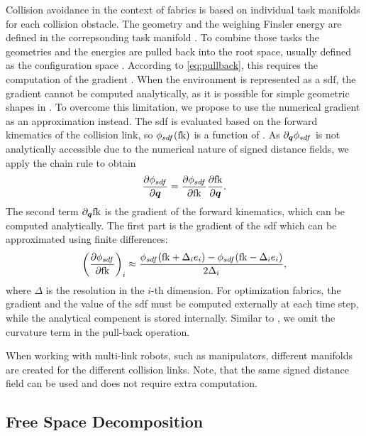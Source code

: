 Collision avoidance in the context of \ac{fabrics} is based on
individual task manifolds for each collision obstacle. The geometry and the 
weighing Finsler energy are defined in the correpsonding task manifold \X{}.
To combine those tasks the geometries and the energies are pulled back into the
root space, usually defined as the configuration space \Q{}. According 
to \cref{eq:pullback}, this requires the computation of the gradient \J{}.
When the environment is represented as a \ac{sdf}, the gradient cannot be
computed analytically, as it is possible for simple geometric shapes in
\cite{Ratliff2021,Spahn2022}. To overcome this limitation, we propose to
use the numerical gradient as an approximation instead.
The \ac{sdf} is evaluated based on the forward kinematics of the collision link,
so $\phi_{sdf}(\textrm{fk})$ is a function of \q{}.
As $\partial_{\bm{q}}\phi_{sdf}$ is not analytically accessible due to the numerical
nature of signed distance fields, we apply the chain rule to obtain
\[
  \frac{\partial\phi_{sdf}}{\partial\bm{q}} = \frac{\partial\phi_{sdf}}{\partial\textrm{fk}}\frac{\partial\textrm{fk}}{\partial\bm{q}}.
\]
The second term $\partial_{\bm{q}}\textrm{fk}$ is the gradient of the forward
kinematics, which can be computed analytically. The first part is the gradient
of the \ac{sdf} which can be
approximated using finite differences:
\[
  \left(\frac{\partial\phi_{sdf}}{\partial\textrm{fk}}\right)_i \approx 
  \frac{\phi_{sdf}(\textrm{fk} + \Delta_i e_i) - \phi_{sdf}(\textrm{fk} - \Delta_i e_i)}{2 \Delta_i},
\]
where $\Delta$ is the resolution in the $i$-th dimension. For optimization
\ac{fabrics}, the gradient and the value of the \ac{sdf} must be computed externally
at each time step, while the analytical compenent is stored internally. Similar
to \cite{Ratliff2021}, we omit the curvature term \Jdot{} in the pull-back
operation.

When working with multi-link robots, such as manipulators, different manifolds
are created for the different collision links. Note, that the same signed
distance field can be used and does not require extra computation.

\subsection{Free Space Decomposition}
\label{sub:Free Space Decomposition}

